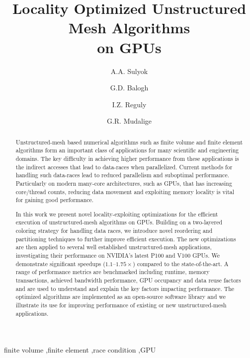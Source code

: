 \documentclass[number]{elsarticle}
\begin{document}
\begin{frontmatter}

\title{Locality Optimized Unstructured Mesh Algorithms\\ on GPUs}

  \author[1,2]{A.A. Sulyok}
  \author[1,2]{G.D. Balogh}
  \author[1]{I.Z. Reguly}
  \author[3]{G.R. Mudalige}
  \address[1]{
    Faculty of Information Technology and Bionics,
    Pázmány Péter Catholic University,
    Budapest, Hungary
  }
  \address[2]{
    3in-PPCU Research Group,
    Pázmány Péter Catholic University,
    Esztergom, Hungary
  }
   \address[3]{
    Department of Computer Science,
    University of Warwick,
    Coventry, United Kingdom
  }

\begin{abstract}

\noindent Unstructured-mesh based numerical algorithms such as finite volume and 
finite element algorithms form an important class of applications for many 
scientific and engineering domains. The key difficulty in achieving higher 
performance from these applications is the indirect accesses that lead to 
data-races when parallelized. Current methods for handling such data-races 
lead to reduced parallelism and suboptimal performance. Particularly on modern 
many-core architectures, such as GPUs, that has increasing core/thread 
counts, reducing data movement and exploiting memory locality is vital for 
gaining good performance.  

In this work we present novel locality-exploiting optimizations for the 
efficient execution of unstructured-mesh algorithms on GPUs. Building on a 
two-layered coloring strategy for handling data races, we introduce novel 
reordering and partitioning techniques to further improve efficient execution. 
The new optimizations are then applied to several well established 
unstructured-mesh applications, investigating their performance on NVIDIA's 
latest P100 and V100 GPUs. We demonstrate significant speedups 
($1.1\text{--}1.75\times$) compared to the state-of-the-art. A range of 
performance metrics are benchmarked including runtime, memory transactions, 
achieved bandwidth performance, GPU occupancy and data reuse factors and 
are used to understand and explain the key factors impacting performance. The 
optimized algorithms are implemented as an open-source software library and 
we illustrate its use for improving performance of existing or new 
unstructured-mesh applications.
\end{abstract}

\begin{keyword}
finite volume \sep finite element \sep race condition \sep GPU
\end{keyword}

\end{frontmatter}
\end{document}
